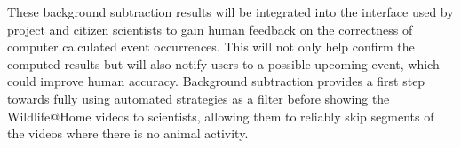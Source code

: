 These background subtraction results will be integrated into the interface used by project and citizen scientists to gain human feedback on the correctness of computer calculated event occurrences. This will not only help confirm the computed results but will also notify users to a possible upcoming event, which could improve human accuracy. Background subtraction provides a first step towards fully using automated strategies as a filter before showing the Wildlife@Home videos to scientists, allowing them to reliably skip segments of the videos where there is no animal activity.

